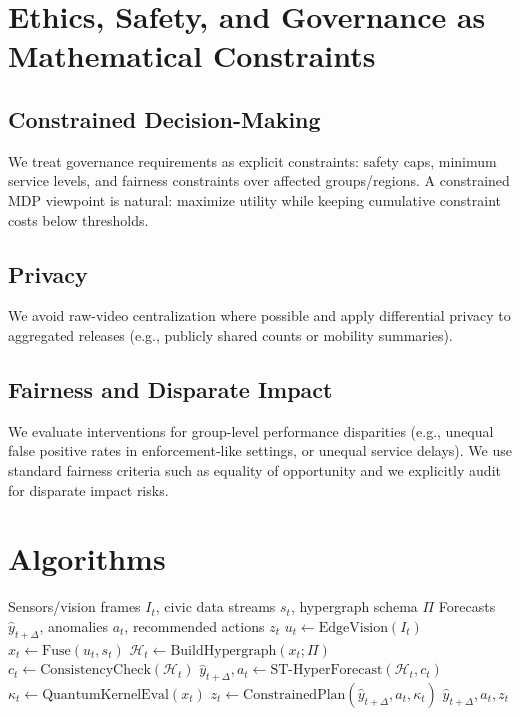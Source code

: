 \documentclass[11pt]{article}
\begin{document}
\section{Ethics, Safety, and Governance as Mathematical Constraints}

\subsection{Constrained Decision-Making}
We treat governance requirements as explicit constraints: safety caps, minimum service levels, and fairness
constraints over affected groups/regions. A constrained MDP viewpoint is natural:
maximize utility while keeping cumulative constraint costs below thresholds. \citep{altman1999cmdp,achiam2017cpo}

\subsection{Privacy}
We avoid raw-video centralization where possible and apply differential privacy to aggregated releases
(e.g., publicly shared counts or mobility summaries). \citep{dwork2006dp,dwork2014foundations,abadi2016dpdl}

\subsection{Fairness and Disparate Impact}
We evaluate interventions for group-level performance disparities (e.g., unequal false positive rates in
enforcement-like settings, or unequal service delays). We use standard fairness criteria such as equality
of opportunity and we explicitly audit for disparate impact risks. \citep{hardt2016equality,barocas2016bigdata}

\section{Algorithms}

\begin{algorithm}[t]
\caption{QAHUS Processing Pipeline (Deployable Template)}
\begin{algorithmic}[1]
\Require Sensors/vision frames $I_t$, civic data streams $s_t$, hypergraph schema $\Pi$
\Ensure Forecasts $\hat{y}_{t+\Delta}$, anomalies $a_t$, recommended actions $z_t$
\State $u_t \leftarrow \mathrm{EdgeVision}(I_t)$ 
\State $x_t \leftarrow \mathrm{Fuse}(u_t, s_t)$ 
\State $\mathcal{H}_t \leftarrow \mathrm{BuildHypergraph}(x_t;\Pi)$
\State $c_t \leftarrow \mathrm{ConsistencyCheck}(\mathcal{H}_t)$ 
\State $\hat{y}_{t+\Delta}, a_t \leftarrow \mathrm{ST\text{-}HyperForecast}(\mathcal{H}_t, c_t)$
\State $\kappa_t \leftarrow \mathrm{QuantumKernelEval}(x_t)$ 
\State $z_t \leftarrow \mathrm{ConstrainedPlan}(\hat{y}_{t+\Delta}, a_t, \kappa_t)$
\State \Return $\hat{y}_{t+\Delta}, a_t, z_t$
\end{algorithmic}
\end{algorithm}
\end{document}
